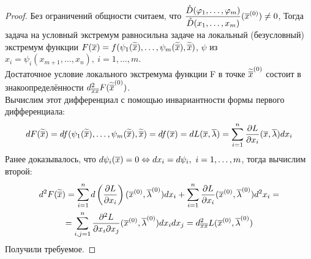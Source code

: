 \begin{proof}
	Без ограничений общности считаем, что $\displaystyle\frac{\mathring D(\varphi_1,\dots,\varphi_m)}{\mathring D(x_1,\dots,x_m)}(\overline x^{({0})})\ne0$, Тогда задача на условный экстремум равносильна задаче на локальный (безусловный) экстремум функции $F(\overline x)=f(\psi_1({\widetilde{\overline x}}),\dots,\psi_m({\widetilde{\overline x}}),{\widetilde{\overline x}})$, $\psi$ из $x_i=\psi_i(x_{m+1},\dots,x_n),\ i=1,\dots,m$.\\
	Достаточное условие локального экстремума функции F в точке ${\widetilde{\overline x}}^{({0})}$ состоит в знакоопределённости $d^2_{\overline x\overline x}F({\widetilde{\overline x}}^{({0})})$.\\
	Вычислим этот дифференциал с помощью инвариантности формы первого дифференциала:
	\[dF(\tvx)=df(\psi_1(\tvx),\dots,\psi_m(\tvx),\tvx)=df(\vx)=dL(\vx,\v\la)=\sum_{i=1}^n\frac{\vd L}{\vd x_i}(\vx,\v\la)dx_i\]
	Ранее доказывалось, что $d\psi_i(\vx)=0\lra dx_i=d\psi_i,\ i=1,\dots,m$, тогда вычислим второй:
	\begin{multline*}
		d^2F(\tvx)=\sum_{i=1}^nd\l(\frac{\vd L}{\vd x_i}\r)(\vx\n,\v\la\n)dx_i+\sum_{i=1}^n\frac{\vd L}{\vd x_i}(\vx\n,\v\la\n)d^2x_i=\\
		=\sum_{i,j=1}^n\frac{\vd^2L}{\vd x_i\vd x_j}(\vx\n,\v\la\n)dx_idx_j=d^2_{\vx\vx}L(\vx\n,\v\la\n)
	\end{multline*}
	Получили требуемое.
\end{proof}
